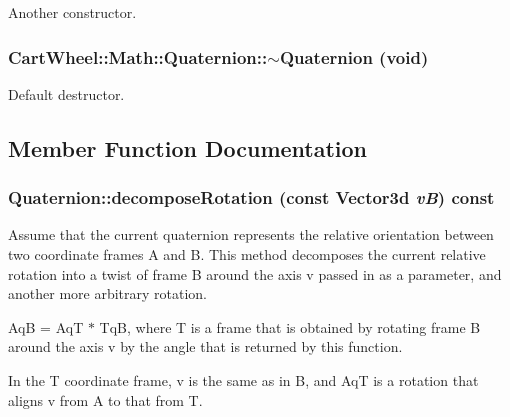 \label{classCartWheel_1_1Math_1_1Quaternion_add84f474836720f819997c46d4125b78}
Another constructor. \hypertarget{classCartWheel_1_1Math_1_1Quaternion_a3ad9a74cb7be18ff500ea3628bb0adf0}{
\subsubsection[{$\sim$Quaternion}]{\setlength{\rightskip}{0pt plus 5cm}CartWheel::Math::Quaternion::$\sim$Quaternion (void)}}
\label{classCartWheel_1_1Math_1_1Quaternion_a3ad9a74cb7be18ff500ea3628bb0adf0}
Default destructor. 

\subsection{Member Function Documentation}
\hypertarget{classCartWheel_1_1Math_1_1Quaternion_a6a8181b3bbf423b18a690563c98e294e}{
\subsubsection[{decomposeRotation}]{ Quaternion::decomposeRotation (const {\bf Vector3d} {\em vB}) const}}
\label{classCartWheel_1_1Math_1_1Quaternion_a6a8181b3bbf423b18a690563c98e294e}
Assume that the current quaternion represents the relative orientation between two coordinate frames A and B. This method decomposes the current relative rotation into a twist of frame B around the axis v passed in as a parameter, and another more arbitrary rotation.

AqB = AqT $\ast$ TqB, where T is a frame that is obtained by rotating frame B around the axis v by the angle that is returned by this function.

In the T coordinate frame, v is the same as in B, and AqT is a rotation that aligns v from A to that from T.

